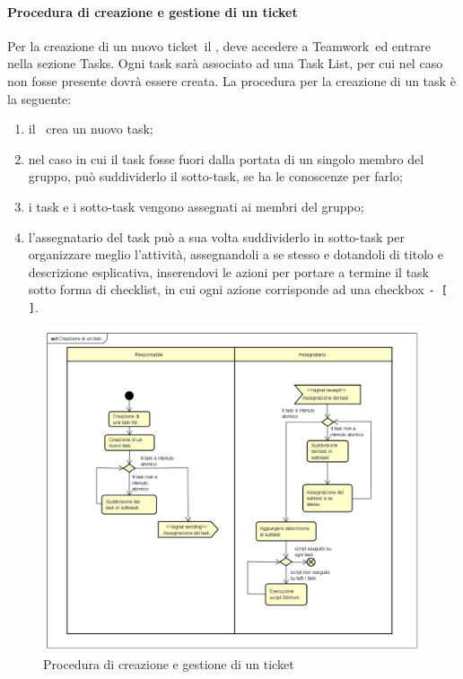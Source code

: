 \documentclass[../NormeProgetto.tex]{subfiles}
\begin{document}
			\paragraph{Procedura di creazione e gestione di un ticket}
				Per la creazione di un nuovo ticket\g\ il \responsabilediprogetto, deve accedere a Teamwork\g\ ed entrare nella sezione Tasks. Ogni task sarà associato ad una Task List, per cui nel caso non fosse presente dovrà essere creata. La procedura per la creazione di un task è la seguente:
				\begin{enumerate}
					\item il \responsabilediprogetto\ crea un nuovo task;
					\item nel caso in cui il task fosse fuori dalla portata di un singolo membro del gruppo, può suddividerlo il sotto-task, se ha le conoscenze per farlo;
					\item i task e i sotto-task vengono assegnati ai membri del gruppo;
					\item l'assegnatario del task può a sua volta suddividerlo in sotto-task per organizzare meglio l'attività, assegnandoli a se stesso e dotandoli di titolo e descrizione esplicativa, inserendovi le azioni per portare a termine il task sotto forma di checklist, in cui ogni azione corrisponde ad una checkbox \texttt{- [ ]}.
				\end{enumerate}
				\begin{figure}[H]
					\centering
					\includegraphics[scale=0.55]{sections/img/creazioneTask.png}
					\caption{Procedura di creazione e gestione di un ticket}\label{fig:Procedura di creazione e gestione di un ticket - Parte 1} 
				\end{figure}
\end{document}
